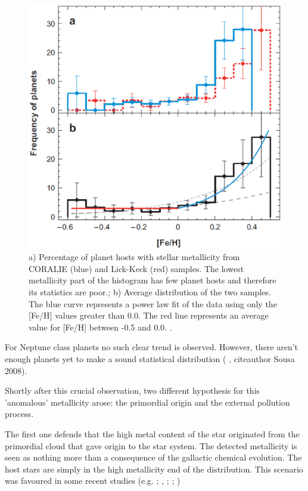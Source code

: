 \documentclass[dvips,12pt,a4paper]{report}
\begin{document}
\begin{figure}[h]
\centering
\includegraphics[height=10 cm]{pics/fehhist}
\caption[Histograms of Frequency of planets with metallicity ]{a) Percentage of planet hosts with stellar metallicity from CORALIE (blue) and Lick-Keck (red) samples. The lowest metallicity part of the histogram has few planet hosts and therefore its statistics are poor.; b) Average distribution of the two samples. The blue curve represents a power law fit of the data using only the [Fe/H] values greater than 0.0. The red line represents an average value for [Fe/H] between -0.5 and 0.0.  \citep{Udry-2007}.}
\label{histfeh}
\end{figure}

For Neptune class planets no such clear trend is observed. However, there aren't enough planets yet to make a sound statistical distribution (\citeauthor{Udry-2006} \citeyear{Udry-2006}, citeauthor Sousa 2008).

Shortly after this crucial observation, two different hypothesis for this 'anomalous' metallicity arose: the primordial origin and the external pollution process. 

The first one defends that the high metal content of the star originated from the primordial cloud that gave origin to the star system. The detected metallicity is seen as nothing more than a consequence of the gallactic chemical evolution. The host stars are simply in the high metallicity end of the distribution. This scenario was favoured in some recent studies (e.g. \citeauthor{Sadakane-2002} \citeyear{Sadakane-2002}; \citeauthor{Santos-2003} \citeyear{Santos-2003}, \citeyear{Santos-2005a}; \citeauthor{Fischer-2005} \citeyear{Fischer-2005}; \citeauthor{Ecuvillon-2006b} \citeyear{Ecuvillon-2006b}) 
\end{document}
